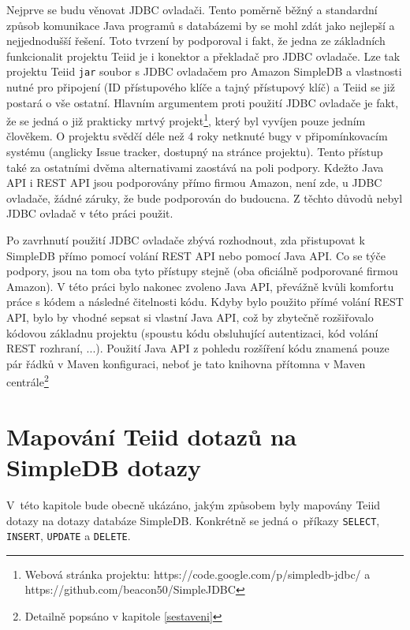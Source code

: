 \documentclass[oneside,12pt]{fithesis2}
\begin{document}
Nejprve se budu věnovat JDBC ovladači. Tento poměrně běžný a standardní způsob komunikace Java programů s databázemi by se mohl zdát jako nejlepší a nejjednodušší řešení. Toto tvrzení by podporoval i fakt, že jedna ze základních funkcionalit projektu Teiid je i konektor a překladač pro JDBC ovladače. Lze tak  projektu Teiid \verb&jar& soubor s JDBC ovladačem pro Amazon SimpleDB a vlastnosti nutné pro připojení (ID přístupového klíče a tajný přístupový klíč) a Teiid se již postará o vše ostatní. Hlavním argumentem proti použití JDBC ovladače je fakt, že se jedná o již prakticky mrtvý projekt\footnote{Webová stránka projektu: https://code.google.com/p/simpledb-jdbc/ a https://github.com/beacon50/SimpleJDBC}, který byl vyvíjen pouze jedním člověkem. O  projektu svědčí déle než  4 roky netknuté bugy v připomínkovacím systému (anglicky Issue tracker, dostupný na stránce projektu). Tento přístup také za ostatními dvěma alternativami zaostává na poli podpory. Kdežto Java API i REST API jsou podporovány přímo firmou Amazon, není zde, u JDBC ovladače, žádné záruky, že bude podporován do budoucna. Z těchto důvodů nebyl JDBC ovladač v této práci použit.

Po zavrhnutí použití JDBC ovladače zbývá rozhodnout, zda přistupovat k SimpleDB přímo pomocí volání REST API nebo pomocí Java API. Co se týče podpory, jsou na tom oba tyto přístupy stejně (oba oficiálně podporované firmou Amazon). V této práci bylo nakonec zvoleno Java API, převážně kvůli komfortu práce s kódem a následné čitelnosti kódu. Kdyby bylo použito přímé volání REST API, bylo by vhodné sepsat si vlastní Java API, což by zbytečně rozšiřovalo kódovou základnu projektu (spoustu kódu obsluhující autentizaci, kód  volání REST rozhraní, ...). Použití Java API z pohledu rozšíření kódu znamená pouze pár řádků v Maven konfiguraci, neboť je tato knihovna přítomna v Maven centrále\footnote{Detailně popsáno v kapitole \ref{sestaveni}}

\chapter{Mapování Teiid dotazů na SimpleDB dotazy}
V~této kapitole bude obecně ukázáno, jakým způsobem byly mapovány Teiid dotazy na dotazy databáze SimpleDB. Konkrétně se jedná o~příkazy \verb<SELECT<, \verb<INSERT<, \verb<UPDATE< a \verb<DELETE<.
\end{document}
